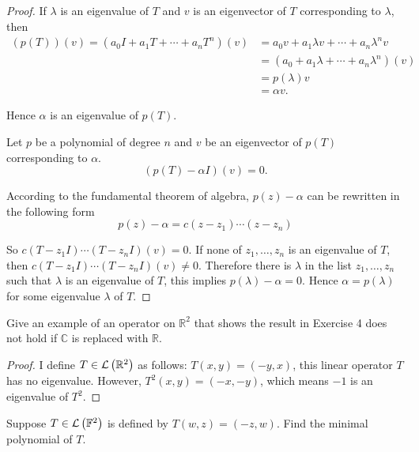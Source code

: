 \begin{proof}
    If $\lambda$ is an eigenvalue of $T$ and $v$ is an eigenvector of $T$ corresponding to $\lambda$, then
    \begin{align*}
        (p(T))(v) = (a_{0}I + a_{1}T + \cdots + a_{n}T^{n})(v) & = a_{0}v + a_{1}\lambda v + \cdots + a_{n}\lambda^{n}v  \\
                                                               & = (a_{0} + a_{1}\lambda + \cdots + a_{n}\lambda^{n})(v) \\
                                                               & = p(\lambda)v                                           \\
                                                               & = \alpha v.
    \end{align*}

    Hence $\alpha$ is an eigenvalue of $p(T)$.
    \bigskip

    Let $p$ be a polynomial of degree $n$ and $v$ be an eigenvector of $p(T)$ corresponding to $\alpha$.
    \[
        (p(T) - \alpha I)(v) = 0.
    \]

    According to the fundamental theorem of algebra, $p(z) - \alpha$ can be rewritten in the following form
    \[
        p(z) - \alpha = c(z - z_{1})\cdots (z - z_{n})
    \]

    So $c(T - z_{1}I)\cdots (T - z_{n}I)(v) = 0$. If none of $z_{1}, \ldots, z_{n}$ is an eigenvalue of $T$, then $c(T - z_{1}I)\cdots (T - z_{n}I)(v) \ne 0$. Therefore there is $\lambda$ in the list $z_{1}, \ldots, z_{n}$ such that $\lambda$ is an eigenvalue of $T$, this implies $p(\lambda) - \alpha = 0$. Hence $\alpha = p(\lambda)$ for some eigenvalue $\lambda$ of $T$.
\end{proof}
\newpage

\begin{exercise}
    Give an example of an operator on $\mathbb{R}^{2}$ that shows the result in Exercise 4 does not hold if $\mathbb{C}$ is replaced with $\mathbb{R}$.
\end{exercise}

\begin{proof}
    I define $T\in\mathcal{L}\left({\mathbb{R}^{2}}\right)$ as follows: $T(x, y) = (-y, x)$, this linear operator $T$ has no eigenvalue. However, $T^{2}(x, y) = (-x, -y)$, which means $-1$ is an eigenvalue of $T^{2}$.
\end{proof}
\newpage

\begin{exercise}
    Suppose $T \in \mathcal{L}\left({\mathbb{F}^{2}}\right)$ is defined by $T(w, z) = (-z, w)$. Find the minimal polynomial of $T$.
\end{exercise}

